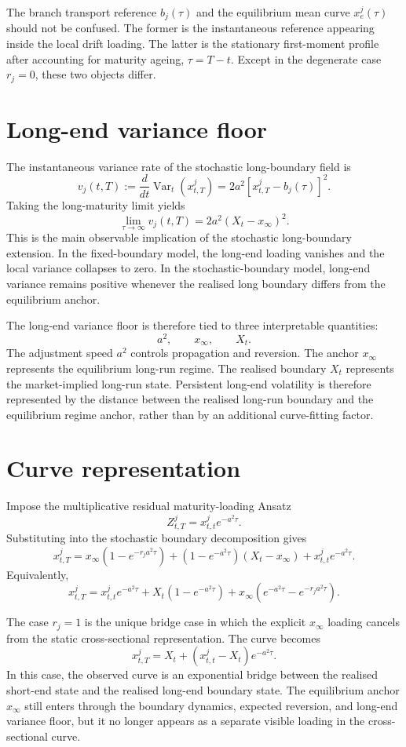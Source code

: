 \documentclass[11pt,oneside]{book}
\begin{document}
The branch transport reference \(b_j(\tau)\) and the equilibrium mean curve \(x^j_e(\tau)\) should not be confused. The former is the instantaneous reference appearing inside the local drift loading. The latter is the stationary first-moment profile after accounting for maturity ageing, \(\tau=T-t\). Except in the degenerate case \(r_j=0\), these two objects differ.

\section{Long-end variance floor}

The instantaneous variance rate of the stochastic long-boundary field is
\[
v_j(t,T)
:=
\frac{d}{dt}\operatorname{Var}_t(x^j_{t,T})
=
2a^2\left[x^j_{t,T}-b_j(\tau)\right]^2.
\]
Taking the long-maturity limit yields
\[
\lim_{\tau\to\infty}v_j(t,T)
=
2a^2(X_t-x_\infty)^2.
\]
This is the main observable implication of the stochastic long-boundary extension. In the fixed-boundary model, the long-end loading vanishes and the local variance collapses to zero. In the stochastic-boundary model, long-end variance remains positive whenever the realised long boundary differs from the equilibrium anchor.

The long-end variance floor is therefore tied to three interpretable quantities:
\[
a^2,
\qquad
x_\infty,
\qquad
X_t.
\]
The adjustment speed \(a^2\) controls propagation and reversion. The anchor \(x_\infty\) represents the equilibrium long-run regime. The realised boundary \(X_t\) represents the market-implied long-run state. Persistent long-end volatility is therefore represented by the distance between the realised long-run boundary and the equilibrium regime anchor, rather than by an additional curve-fitting factor.

\section{Curve representation}

Impose the multiplicative residual maturity-loading Ansatz
\[
Z^j_{t,T}
=
x^j_{t,t}e^{-a^2\tau}.
\]
Substituting into the stochastic boundary decomposition gives
\[
x^j_{t,T}
=
x_\infty\left(1-e^{-r_j a^2\tau}\right)
+
\left(1-e^{-a^2\tau}\right)(X_t-x_\infty)
+
x^j_{t,t}e^{-a^2\tau}.
\]
Equivalently,
\[
x^j_{t,T}
=
x^j_{t,t}e^{-a^2\tau}
+
X_t\left(1-e^{-a^2\tau}\right)
+
x_\infty\left(e^{-a^2\tau}-e^{-r_j a^2\tau}\right).
\]

The case \(r_j=1\) is the unique bridge case in which the explicit \(x_\infty\) loading cancels from the static cross-sectional representation. The curve becomes
\[
x^j_{t,T}
=
X_t
+
\left(x^j_{t,t}-X_t\right)e^{-a^2\tau}.
\]
In this case, the observed curve is an exponential bridge between the realised short-end state and the realised long-end boundary state. The equilibrium anchor \(x_\infty\) still enters through the boundary dynamics, expected reversion, and long-end variance floor, but it no longer appears as a separate visible loading in the cross-sectional curve.
\end{document}
